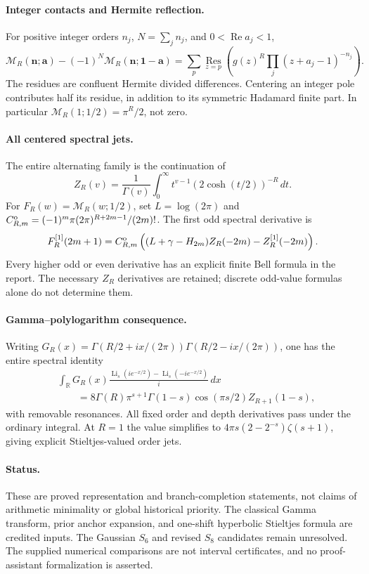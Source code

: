 \paragraph{Integer contacts and Hermite reflection.}
For positive integer orders $n_j$, $N=\sum_jn_j$, and
$0<\operatorname{Re}a_j<1$,
\[
 \mathcal M_R(\boldsymbol n;\boldsymbol a)
 -(-1)^N\mathcal M_R(\boldsymbol n;\boldsymbol1-\boldsymbol a)
 =\sum_p\operatorname*{Res}_{z=p}
          \left(g(z)^R\prod_j(z+a_j-1)^{-n_j}\right).
\]
The residues are confluent Hermite divided differences. Centering an
integer pole contributes half its residue, in addition to its symmetric
Hadamard finite part. In particular
$\mathcal M_R(1;1/2)=\pi^R/2$, not zero.

\paragraph{All centered spectral jets.}
The entire alternating family is the continuation of
\[
 Z_R(v)=\frac1{\Gamma(v)}\int_0^\infty
          t^{v-1}(2\cosh(t/2))^{-R}\,dt.
\]
For $F_R(w)=\mathcal M_R(w;1/2)$, set $L=\log(2\pi)$ and
$C^{\rm o}_{R,m}=(-1)^m\pi(2\pi)^{R+2m-1}/(2m)!$.
The first odd spectral derivative is
\[
 F_R^{[1]}(2m+1)=C^{\rm o}_{R,m}
 \left((L+\gamma-H_{2m})Z_R(-2m)-Z_R^{[1]}(-2m)\right).
\]
Every higher odd or even derivative has an explicit finite Bell formula
in the report. The necessary $Z_R$ derivatives are retained; discrete
odd-value formulas alone do not determine them.

\paragraph{Gamma--polylogarithm consequence.}
Writing
$G_R(x)=\Gamma(R/2+ix/(2\pi))\Gamma(R/2-ix/(2\pi))$, one has the entire
spectral identity
\begin{align*}
 &\int_{\mathbb R}G_R(x)
 \frac{\operatorname{Li}_s(ie^{-x/2})-
       \operatorname{Li}_s(-ie^{-x/2})}{i}\,dx\\
 &\qquad=8\Gamma(R)\pi^{s+1}\Gamma(1-s)
                      \cos(\pi s/2)Z_{R+1}(1-s),
\end{align*}
with removable resonances. All fixed order and depth derivatives pass
under the ordinary integral. At $R=1$ the value simplifies to
$4\pi s(2-2^{-s})\zeta(s+1)$, giving explicit Stieltjes-valued order jets.

\paragraph{Status.}
These are proved representation and branch-completion statements, not
claims of arithmetic minimality or global historical priority. The classical
Gamma transform, prior anchor expansion, and one-shift hyperbolic Stieltjes
formula are credited inputs. The Gaussian $S_6$ and revised $S_8$ candidates
remain unresolved. The supplied numerical comparisons are not interval
certificates, and no proof-assistant formalization is asserted.

